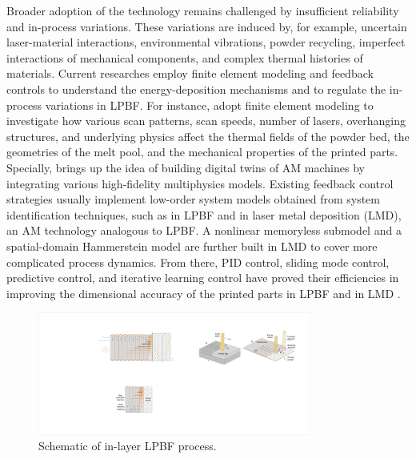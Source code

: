 \documentclass [11pt, proquest] {uwthesis}[2020/02/24]
\begin{document}
Broader adoption of the technology remains
challenged by insufficient reliability and in-process variations.
These variations are induced by, for example, uncertain laser-material
interactions, environmental vibrations, powder recycling, imperfect
interactions of mechanical components, and complex thermal histories
of materials\cite{wang2018multirate,kruth2007feedback,seyda2012investigation}. Current researches employ finite
element modeling and feedback controls to understand the energy-deposition
mechanisms and to regulate the in-process variations in LPBF. For instance,
\cite{masoomi2017laser,hussein2013finite,foroozmehr2016finite,khairallah2016laser}
adopt finite element modeling to investigate how various scan patterns,
scan speeds, number of lasers, overhanging structures, and underlying
physics affect the thermal fields of the powder bed, the geometries
of the melt pool, and the mechanical properties of the printed parts.
Specially, \cite{debroy2017building} brings up the idea of building
digital twins of AM machines by integrating various high-fidelity
multiphysics models. Existing feedback control strategies usually
implement low-order system models obtained from system identification
techniques, such as \cite{kruth2007feedback,craeghs2010feedback,zheng2020distributed}
in LPBF and \cite{song2011feedback,cao2015control,sammons2014repetitive}
in laser metal deposition (LMD), an AM technology analogous to LPBF.
A nonlinear memoryless submodel \cite{fathi2008geometry,cao2015control}
and a spatial-domain Hammerstein model \cite{sammons2014repetitive}
are further built in LMD to cover more complicated process dynamics.
From there, PID control, sliding mode control, predictive control,
and iterative learning control have proved their efficiencies in improving
the dimensional accuracy of the printed parts in LPBF \cite{kruth2007feedback,craeghs2010feedback,vlasea2015development,fleming2020tracking}
and in LMD \cite{hofman2012camera,salehi2006melt,fathi2007clad,fathi2008geometry,song2011feedback,tang2011layer}.
\begin{figure}[!ht]
\begin{centering}
\includegraphics[clip,width=9cm]{Closed-loop-simulation/SLS schematic diagram-2}
\par\end{centering}
\centering{}\caption{\label{fig:Schematic-of-in-layer}Schematic of in-layer LPBF process.}
\end{figure}
\end{document}
